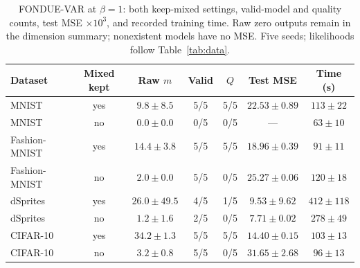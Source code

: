 \begin{table}[H]
\caption{FONDUE-VAR at $\beta=1$: both keep-mixed settings, valid-model and quality counts, test MSE $\times10^3$, and recorded training time. Raw zero outputs remain in the dimension summary; nonexistent models have no MSE. Five seeds; likelihoods follow Table~\ref{tab:data}.}\label{tab:var}
\footnotesize
\setlength{\tabcolsep}{3.5pt}
\begin{tabular*}{\textwidth}{@{\extracolsep{\fill}}lcccccc@{}}
\toprule
Dataset & Mixed kept & Raw $m$ & Valid & $Q$ & Test MSE & Time (s) \\
\midrule
MNIST & yes & $9.8 \pm 8.5$ & 5/5 & 5/5 & $22.53 \pm 0.89$ & $113 \pm 22$ \\
MNIST & no & $0.0 \pm 0.0$ & 0/5 & 0/5 & --- & $63 \pm 10$ \\
Fashion-MNIST & yes & $14.4 \pm 3.8$ & 5/5 & 5/5 & $18.96 \pm 0.39$ & $91 \pm 11$ \\
Fashion-MNIST & no & $2.0 \pm 0.0$ & 5/5 & 0/5 & $25.27 \pm 0.06$ & $120 \pm 18$ \\
dSprites & yes & $26.0 \pm 49.5$ & 4/5 & 1/5 & $9.53 \pm 9.62$ & $412 \pm 118$ \\
dSprites & no & $1.2 \pm 1.6$ & 2/5 & 0/5 & $7.71 \pm 0.02$ & $278 \pm 49$ \\
CIFAR-10 & yes & $34.2 \pm 1.3$ & 5/5 & 5/5 & $14.40 \pm 0.15$ & $103 \pm 13$ \\
CIFAR-10 & no & $3.2 \pm 0.8$ & 5/5 & 0/5 & $31.65 \pm 2.68$ & $96 \pm 13$ \\
\bottomrule
\end{tabular*}
\end{table}
